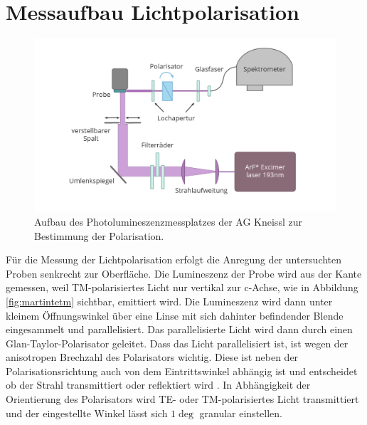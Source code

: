 \section{Messaufbau Lichtpolarisation}
\begin{figure}[!htb]
    \centering
    \begin{minipage}[t]{\linewidth}
        \centering
        \includegraphics[width=0.8\linewidth]{Bilder/aufbauPol.png}
        \caption{Aufbau des Photolumineszenzmessplatzes der AG Kneissl zur Bestimmung der Polarisation. }
        \label{fig:wurtz}
    \end{minipage}%
\end{figure}
\vspace{1cm}
\noindent
Für die Messung der Lichtpolarisation erfolgt die Anregung der untersuchten Proben senkrecht zur Oberfläche. Die Lumineszenz der Probe wird aus der Kante gemessen, weil TM-polarisiertes Licht nur vertikal zur c-Achse, wie in Abbildung \ref{fig:martintetm} sichtbar, emittiert wird. Die Lumineszenz wird dann unter kleinem Öffnungswinkel über eine Linse mit sich dahinter befindender Blende eingesammelt und parallelisiert. Das parallelisierte Licht wird dann durch einen Glan-Taylor-Polarisator geleitet. Dass das Licht parallelisiert ist, ist wegen der anisotropen Brechzahl des Polarisators wichtig. Diese ist neben der Polarisationsrichtung auch von dem Eintrittswinkel abhängig ist und entscheidet ob der Strahl transmittiert oder reflektiert wird \cite{0950-7671-25-12-304}. In Abhängigkeit der Orientierung des Polarisators wird TE- oder TM-polarisiertes Licht transmittiert und der eingestellte Winkel lässt sich $1\deg$ granular einstellen. 

